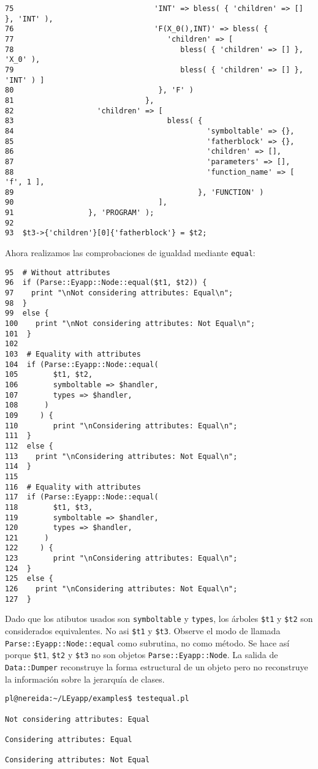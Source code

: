 \begin{enumerate}
\begin{verbatim}
75                                'INT' => bless( { 'children' => [] }, 'INT' ),
76                                'F(X_0(),INT)' => bless( {
77                                   'children' => [
78                                      bless( { 'children' => [] }, 'X_0' ),
79                                      bless( { 'children' => [] }, 'INT' ) ]
80                                 }, 'F' )
81                              },
82                   'children' => [
83                                   bless( {
84                                            'symboltable' => {},
85                                            'fatherblock' => {},
86                                            'children' => [],
87                                            'parameters' => [],
88                                            'function_name' => [ 'f', 1 ],
89                                          }, 'FUNCTION' )
90                                 ],
91                 }, 'PROGRAM' );
92
93  $t3->{'children'}[0]{'fatherblock'} = $t2;
\end{verbatim}
Ahora realizamos las comprobaciones de igualdad mediante \verb|equal|:
\begin{verbatim}
95  # Without attributes
96  if (Parse::Eyapp::Node::equal($t1, $t2)) {
97    print "\nNot considering attributes: Equal\n";
98  }
99  else {
100    print "\nNot considering attributes: Not Equal\n";
101  }
102
103  # Equality with attributes
104  if (Parse::Eyapp::Node::equal(
105        $t1, $t2,
106        symboltable => $handler,
107        types => $handler,
108      )
109     ) {
110        print "\nConsidering attributes: Equal\n";
111  }
112  else {
113    print "\nConsidering attributes: Not Equal\n";
114  }
115
116  # Equality with attributes
117  if (Parse::Eyapp::Node::equal(
118        $t1, $t3,
119        symboltable => $handler,
120        types => $handler,
121      )
122     ) {
123        print "\nConsidering attributes: Equal\n";
124  }
125  else {
126    print "\nConsidering attributes: Not Equal\n";
127  }
\end{verbatim}
Dado que los atibutos usados son \verb|symboltable| y \verb|types|, los árboles \verb|$t1| y \verb|$t2|
son considerados equivalentes. No asi \verb|$t1| y \verb|$t3|.
Observe el modo de llamada \verb|Parse::Eyapp::Node::equal| como subrutina, no como método. 
Se hace así porque \verb|$t1|, \verb|$t2| y  \verb|$t3| no son objetos 
\verb|Parse::Eyapp::Node|. La salida de \verb|Data::Dumper| reconstruye la forma estructural
de un objeto pero no reconstruye la información sobre la jerarquía de clases.

\begin{verbatim}
pl@nereida:~/LEyapp/examples$ testequal.pl

Not considering attributes: Equal

Considering attributes: Equal

Considering attributes: Not Equal
\end{verbatim}
\end{enumerate}

